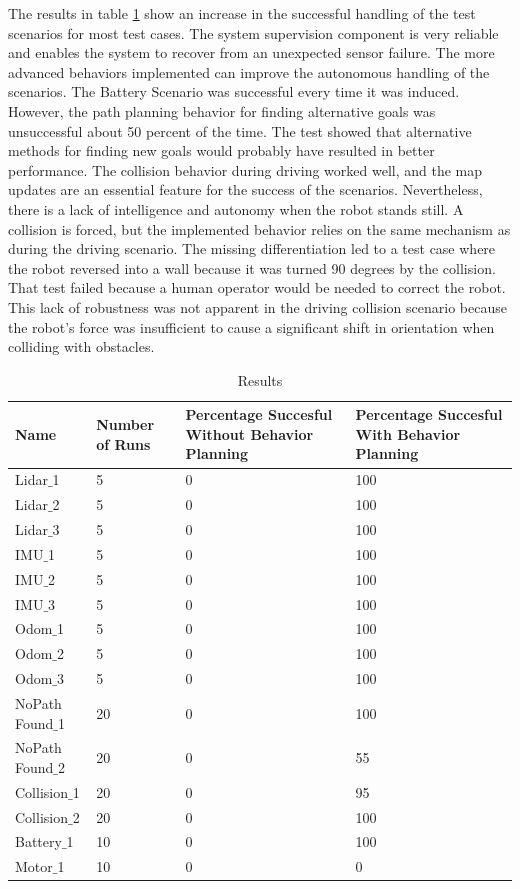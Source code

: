 The results in table \ref{tab:results} show an increase in the successful handling of the test scenarios for most test cases. The system supervision component is very reliable and enables the system to recover from an unexpected sensor failure. The more advanced behaviors implemented can improve the autonomous handling of the scenarios. The Battery Scenario was successful every time it was induced. However, the path planning behavior for finding alternative goals was unsuccessful about 50 percent of the time. The test showed that alternative methods for finding new goals would probably have resulted in better performance. The collision behavior during driving worked well, and the map updates are an essential feature for the success of the scenarios.
Nevertheless, there is a lack of intelligence and autonomy when the robot stands still. A collision is forced, but the implemented behavior relies on the same mechanism as during the driving scenario. The missing differentiation led to a test case where the robot reversed into a wall because it was turned 90 degrees by the collision. That test failed because a human operator would be needed to correct the robot. This lack of robustness was not apparent in the driving collision scenario because the robot's force was insufficient to cause a significant shift in orientation when colliding with obstacles. 

\begin{table}[ht]

	\caption{Results}
	\label{tab:results}
	\begin{tabular}{| m{} | m{}| m{} | m{}|} 
  	\hline
  	\textbf{Name} & \textbf{Number of Runs} &  \textbf{Percentage Succesful Without Behavior Planning} & \textbf{Percentage Succesful With Behavior Planning}\\ 
  	\hline
  	Lidar$\_$1 & 5 & 0 & 100 \\ 
  	\hline
  	Lidar$\_$2 & 5 & 0 & 100 \\ 
  	\hline
  	Lidar$\_$3 & 5 & 0 & 100 \\ 
  	\hline
  	IMU$\_$1 & 5 & 0 & 100 \\ 
  	\hline
  	IMU$\_$2 & 5 & 0 & 100 \\ 
  	\hline
  	IMU$\_$3 & 5 & 0 & 100 \\ 
  	\hline
  	Odom$\_$1 & 5 & 0 & 100 \\ 
  	\hline
  	Odom$\_$2 & 5 & 0 & 100 \\ 
  	\hline
  	Odom$\_$3 & 5 & 0 & 100 \\ 
  	\hline
  	NoPath Found$\_$1 & 20 & 0 & 100 \\ 
  	\hline
  	NoPath Found$\_$2 & 20 & 0 & 55 \\ 
  	\hline
  	Collision$\_$1 & 20 & 0 & 95 \\ 
  	\hline
  	Collision$\_$2 & 20 & 0 & 100 \\ 
  	\hline
  	Battery$\_$1 & 10 & 0 & 100 \\ 
  	\hline
  	Motor$\_$1 & 10 & 0 & 0 \\ 
  	\hline
	\end{tabular}
\end{table} 

